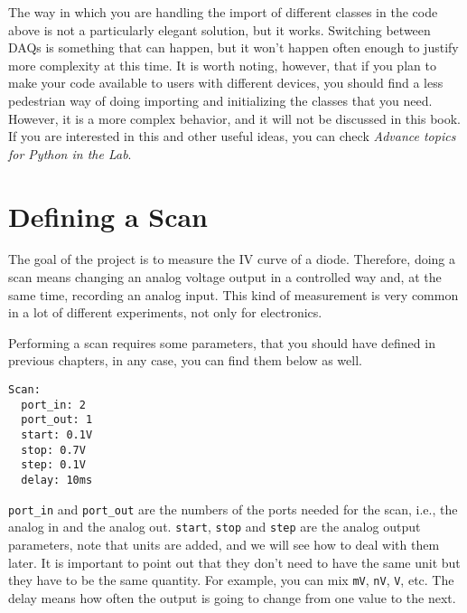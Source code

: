 {

The way in which you are handling the import of different classes in the code above is not a particularly elegant solution, but it works.
Switching between DAQs is something that can happen, but it won't happen
often enough to justify more complexity at this time. It is worth
noting, however, that if you plan to make your code available to users
with different devices, you should find a less pedestrian way of doing
importing and initializing the classes that you need. However, it is a
more complex behavior, and it will not be discussed in this book. If you
are interested in this and other useful ideas, you can check
\emph{Advance topics for Python in the Lab}.

\section{Defining a Scan}\label{defining-ascan}
The goal of the project is to measure the {IV} curve of a diode.
Therefore, doing a scan means changing an analog voltage output in a
controlled way and, at the same time, recording an analog input. This
kind of measurement is very common in a lot of different experiments,
not only for electronics.


Performing a scan requires some parameters, that you should have defined
in previous chapters, in any case, you can find them below as well.

\begin{verbatim}
Scan:
  port_in: 2
  port_out: 1
  start: 0.1V
  stop: 0.7V
  step: 0.1V
  delay: 10ms
\end{verbatim}

\texttt{port_in} and \texttt{port_out} are the numbers of the ports
needed for the scan, i.e., the analog in and the analog out.
\texttt{start}, \texttt{stop} and \texttt{step} are the analog output
parameters, note that units are added, and we will see how to deal with
them later. It is important to point out that they don't need to have
the same unit but they have to be the same quantity. For example, you
can mix \texttt{mV}, \texttt{nV}, \texttt{V}, etc. The delay means how
often the output is going to change from one value to the next.

}
